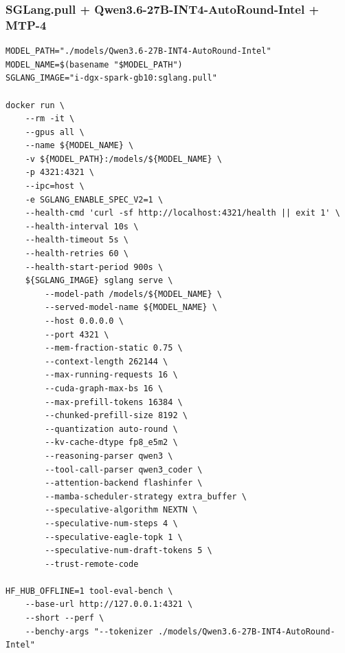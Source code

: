 \documentclass{article}
\begin{document}
\subsubsection{SGLang.pull + Qwen3.6-27B-INT4-AutoRound-Intel + MTP-4}
\begin{lstlisting}
MODEL_PATH="./models/Qwen3.6-27B-INT4-AutoRound-Intel"
MODEL_NAME=$(basename "$MODEL_PATH")
SGLANG_IMAGE="i-dgx-spark-gb10:sglang.pull"

docker run \
    --rm -it \
    --gpus all \
    --name ${MODEL_NAME} \
    -v ${MODEL_PATH}:/models/${MODEL_NAME} \
    -p 4321:4321 \
    --ipc=host \
    -e SGLANG_ENABLE_SPEC_V2=1 \
    --health-cmd 'curl -sf http://localhost:4321/health || exit 1' \
    --health-interval 10s \
    --health-timeout 5s \
    --health-retries 60 \
    --health-start-period 900s \
    ${SGLANG_IMAGE} sglang serve \
        --model-path /models/${MODEL_NAME} \
        --served-model-name ${MODEL_NAME} \
        --host 0.0.0.0 \
        --port 4321 \
        --mem-fraction-static 0.75 \
        --context-length 262144 \
        --max-running-requests 16 \
        --cuda-graph-max-bs 16 \
        --max-prefill-tokens 16384 \
        --chunked-prefill-size 8192 \
        --quantization auto-round \
        --kv-cache-dtype fp8_e5m2 \
        --reasoning-parser qwen3 \
        --tool-call-parser qwen3_coder \
        --attention-backend flashinfer \
        --mamba-scheduler-strategy extra_buffer \
        --speculative-algorithm NEXTN \
        --speculative-num-steps 4 \
        --speculative-eagle-topk 1 \
        --speculative-num-draft-tokens 5 \
        --trust-remote-code

HF_HUB_OFFLINE=1 tool-eval-bench \
    --base-url http://127.0.0.1:4321 \
    --short --perf \
    --benchy-args "--tokenizer ./models/Qwen3.6-27B-INT4-AutoRound-Intel"
\end{lstlisting}
\end{document}
